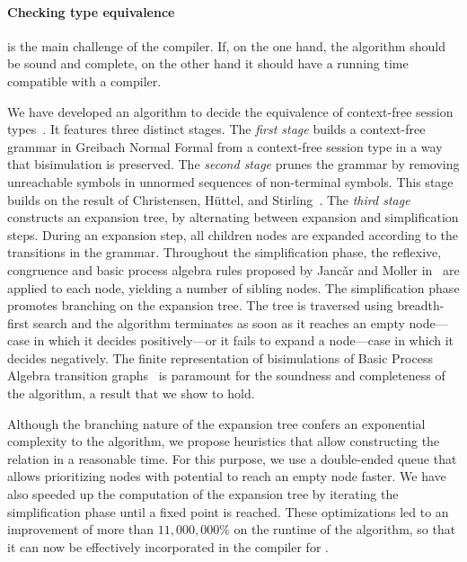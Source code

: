 
\paragraph{Checking type equivalence}

is the main challenge of the compiler. If, on the one hand, the
algorithm should be sound and complete, on the other hand it should
have a running time compatible with a compiler.  %

We have developed an algorithm to decide the equivalence of
context-free session types~\cite{typeEquivalence}.  It features three
distinct stages.
%
The \emph{first stage} builds a context-free grammar in Greibach
Normal Formal %
from a context-free session type in a way that bisimulation is
preserved.
%
The \emph{second stage} prunes the grammar by removing unreachable
symbols in unnormed sequences of non-terminal symbols. This stage
builds on the result of Christensen, H\"uttel, and 
Stirling~\cite{DBLP:journals/iandc/ChristensenHS95}.
%
The \emph{third stage} constructs an expansion tree, by alternating
between expansion and simplification steps. During an expansion step, 
all children nodes are expanded according to the transitions in the 
grammar. %
Throughout the simplification phase, the reflexive, congruence and
basic process algebra rules proposed by Janc\v ar and Moller
in~\cite{janvcar1999techniques} are applied to each node, yielding a
number of sibling nodes.  The simplification phase promotes branching
on the expansion tree.  The tree is traversed using breadth-first
search and the algorithm terminates as soon as it reaches an empty
node---case in which it decides positively---or it fails to expand a
node---case in which it decides negatively.  The finite representation
of bisimulations of Basic Process Algebra transition
graphs~\cite{caucal1986decidabilite,
  DBLP:journals/iandc/ChristensenHS95} is paramount for the soundness
and completeness of the algorithm, a result that we show to hold.

Although the branching nature of the expansion tree confers an
exponential complexity to the algorithm, we propose heuristics that
allow constructing the relation in a reasonable time. For this
purpose, we use a double-ended queue that allows prioritizing nodes
with potential to reach an empty node faster.  We have also speeded up
the computation of the expansion tree by iterating the simplification
phase until a fixed point is reached.  These optimizations led to an
improvement of more than $11,000,000\%$ on the runtime of the
algorithm, so that it can now be effectively incorporated in the
compiler for \freest.

